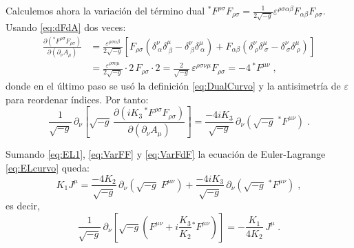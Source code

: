             Calculemos ahora la variación del término dual
            ${}^{*}F^{\rho\sigma}F_{\rho\sigma}
            = \frac{1}{2\sqrt{-g}}\varepsilon^{\rho\sigma\alpha\beta}F_{\alpha\beta}F_{\rho\sigma}$.
            Usando \eqref{eq:dFdA} dos veces:
            \begin{align*}
                \frac{\partial({}^{*}F^{\rho\sigma}F_{\rho\sigma})}
                    {\partial(\partial_{\nu}A_{\mu})}
                &= \frac{\varepsilon^{\rho\sigma\alpha\beta}}{2\sqrt{-g}}
                \left[F_{\rho\sigma}\!\left(\delta^{\nu}_{\ \alpha}\delta^{\mu}_{\ \beta}
                                            -\delta^{\nu}_{\ \beta}\delta^{\mu}_{\ \alpha}\right)
                        +F_{\alpha\beta}\!\left(\delta^{\nu}_{\ \rho}\delta^{\mu}_{\ \sigma}
                                            -\delta^{\nu}_{\ \sigma}\delta^{\mu}_{\ \rho}\right)
                \right]\\
                &= \frac{\varepsilon^{\rho\sigma\nu\mu}}{2\sqrt{-g}}\cdot 2\,F_{\rho\sigma}
                \cdot 2
                = \frac{2}{\sqrt{-g}}\,\varepsilon^{\rho\sigma\nu\mu}F_{\rho\sigma}
                = -4\,{}^{*}F^{\mu\nu}\;,
            \end{align*}
            donde en el último paso se usó la definición \eqref{eq:DualCurvo} y la
            antisimetría de $\varepsilon$ para reordenar índices.  Por tanto:
            \begin{equation}\label{eq:VarFdF}
                \frac{1}{\sqrt{-g}}\,
                \partial_{\nu}\!\left[\sqrt{-g}\,
                \frac{\partial(iK_3\,{}^{*}F^{\rho\sigma}F_{\rho\sigma})}
                    {\partial(\partial_{\nu}A_{\mu})}\right]
                = \frac{-4iK_3}{\sqrt{-g}}\,
                \partial_{\nu}\!\left(\sqrt{-g}\;{}^{*}F^{\mu\nu}\right)\;.
            \end{equation}

            Sumando \eqref{eq:EL1}, \eqref{eq:VarFF} y \eqref{eq:VarFdF} la ecuación
            de Euler-Lagrange \eqref{eq:ELcurvo} queda:
            \begin{equation*}
                K_1 J^{\mu}
                = \frac{-4K_2}{\sqrt{-g}}\,\partial_{\nu}\!\left(\sqrt{-g}\;F^{\mu\nu}\right)
                + \frac{-4iK_3}{\sqrt{-g}}\,\partial_{\nu}\!\left(\sqrt{-g}\;{}^{*}F^{\mu\nu}\right)
                \;,
            \end{equation*}
            es decir,
            \begin{equation}\label{eq:ELprev}
                \frac{1}{\sqrt{-g}}\,\partial_{\nu}\!\left[
                \sqrt{-g}\!\left(F^{\mu\nu} + i\frac{K_3}{K_2}{}^{*}F^{\mu\nu}\right)
                \right]
                = -\frac{K_1}{4K_2}\,J^{\mu}\;.
            \end{equation}

